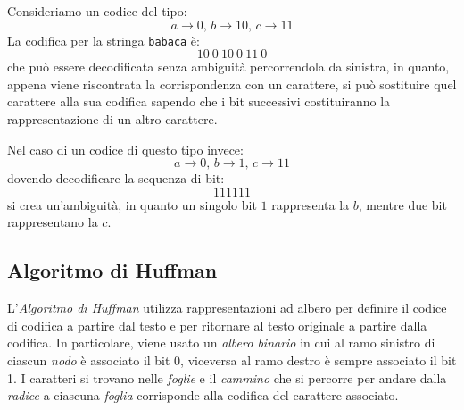 \begin{eg}
    Consideriamo un codice del tipo:
    \[a\to0,\,b\to 10,\,c\to11\]
    La codifica per la stringa \texttt{babaca} è:
    \[10\ 0\ 10\ 0\ 11\ 0\]
    che può essere decodificata senza ambiguità percorrendola da sinistra, in
    quanto, appena viene riscontrata la corrispondenza con un carattere, si
    può sostituire quel carattere alla sua codifica sapendo che i bit successivi
    costituiranno la rappresentazione di un altro carattere.

    \bigskip\noindent
    Nel caso di un codice di questo tipo invece:
    \[a\to0,\, b\to1,\,c\to 11\]
    dovendo decodificare la sequenza di bit:
    \[111111\]
    si crea un'ambiguità, in quanto un singolo bit $1$ rappresenta la $b$, mentre
    due bit rappresentano la $c$.
\end{eg}

\subsection{Algoritmo di Huffman}
L'\emph{Algoritmo di Huffman} utilizza rappresentazioni ad albero per definire
il codice di codifica a partire dal testo e per ritornare al testo originale a
partire dalla codifica. In particolare, viene usato un \emph{albero binario}
in cui al ramo sinistro di ciascun \emph{nodo} è associato il bit 0, viceversa
al ramo destro è sempre associato il bit 1. I caratteri si trovano nelle
\emph{foglie} e il \emph{cammino} che si percorre per andare dalla \emph{radice}
a ciascuna \emph{foglia} corrisponde alla codifica del carattere associato.

